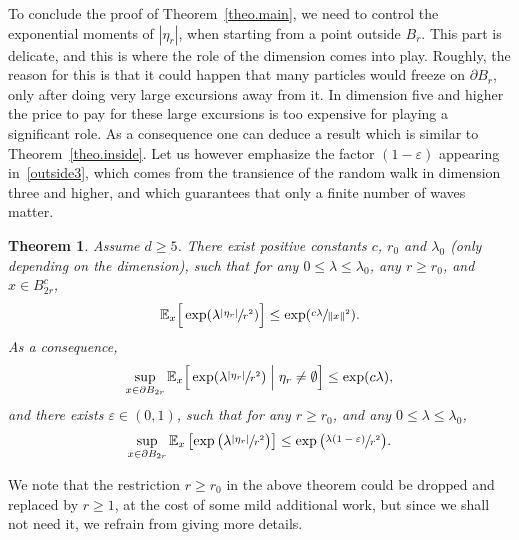 \documentclass[JEP,XML,SOM,Unicode,NoFloatCountersInSection,published]{cedram}
\theoremstyle{plain}
\newtheorem{theorem}{Theorem}[section]
\theoremstyle{definition}
\newcommand{\1}{{\text{\Large $\mathfrak 1$}}}
\begin{document}
To conclude the proof of Theorem~\ref{theo.main},
we need to control the exponential moments of $|\eta_r|$,
when starting from a point outside $B_r$.
This part is delicate, and this is where the role of the dimension
comes into play. Roughly, the reason for this is that
it could happen that many particles would freeze
on $\partial B_r$, only after doing very large excursions away from it.
In dimension five and higher the price to pay for
these large excursions is too expensive for playing a significant role.
As a consequence one can deduce
a result which is similar to Theorem~\ref{theo.inside}.
Let us however emphasize the factor $(1-\varepsilon)$
appearing in~\eqref{outside3}, which
comes from the transience of the random walk in
dimension three and higher,
and which guarantees that only a finite number of waves matter.

\begin{theorem}\label{theo.outside5}
Assume $d\ge 5$.
There exist positive constants $c$, $r_0$ and $\lambda_0$ (only depending on the dimension), such that for any $0\le \lambda\le \lambda_0$, any $r\ge r_0$,
and $x\in B_{2r}^c$,
\begin{equation}\label{outside1}
\mathbb E_x\Big[\exp(\lambda \sfrac{|\eta_r|}{r^2})\Big] \le \exp(\sfrac{c\lambda}{\|x\|^2}).
\end{equation}
As a consequence,
\begin{equation}\label{outside2}
\sup_{x\in \partial B_{2r}} \mathbb E_x\Big[\exp(\lambda \sfrac{|\eta_r|}{r^2})
\Bigm|\eta_r\neq \emptyset \Big] \le \exp(c\lambda),
\end{equation}
and there exists $\varepsilon\in (0,1)$, such that for any $r\ge r_0$, and any $0\le \lambda\le \lambda_0$,
\begin{equation}\label{outside3}
\sup_{x\in \partial B_{2r}} \mathbb E_x\left[\exp\big(\lambda \sfrac{
|\eta_r|}{r^2}\big)\right] \le \exp\big(\sfrac{\lambda (1-\varepsilon)}{r^2}\big).
\end{equation}
\end{theorem}
We note that the restriction $r\ge r_0$ in the above theorem could be dropped and replaced by $r\ge 1$, at the cost of some mild additional work, but since we shall not need it, we refrain from giving more details.
\end{document}
